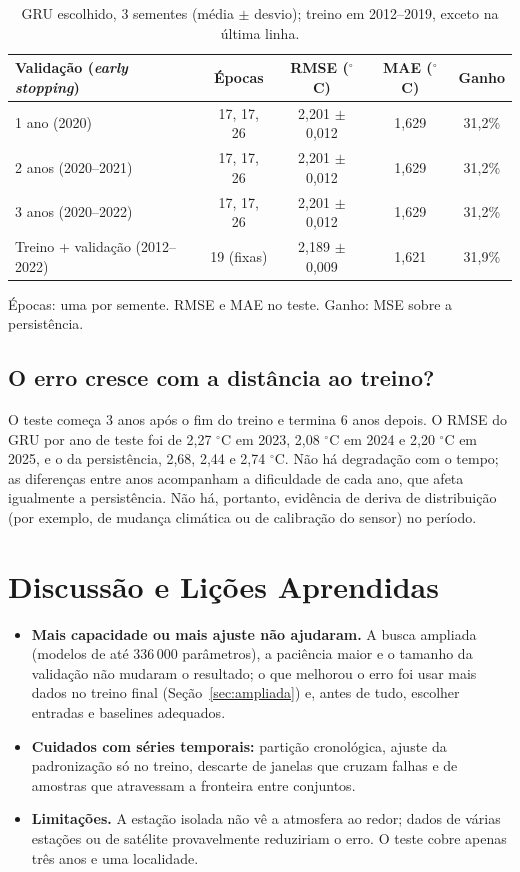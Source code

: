 \documentclass[11pt,a4paper]{article}
\begin{document}
\begin{table}[ht]
\centering
\small
\caption{GRU escolhido, 3 sementes (média $\pm$ desvio); treino em 2012--2019, exceto na última linha.}
\label{tab:valtam}
\begin{tabularx}{\textwidth}{Xcccc}
\toprule
\textbf{Validação (\emph{early stopping})} & \textbf{Épocas} & \textbf{RMSE ($^\circ$C)} & \textbf{MAE ($^\circ$C)} & \textbf{Ganho} \\
\midrule
1 ano (2020) & 17, 17, 26 & 2,201 $\pm$ 0,012 & 1,629 & 31,2\% \\
2 anos (2020--2021) & 17, 17, 26 & 2,201 $\pm$ 0,012 & 1,629 & 31,2\% \\
3 anos (2020--2022) & 17, 17, 26 & 2,201 $\pm$ 0,012 & 1,629 & 31,2\% \\
Treino + validação (2012--2022) & 19 (fixas) & 2,189 $\pm$ 0,009 & 1,621 & 31,9\% \\
\bottomrule
\end{tabularx}
\smallskip

\footnotesize Épocas: uma por semente. RMSE e MAE no teste. Ganho: MSE sobre a persistência.
\end{table}

\subsection{O erro cresce com a distância ao treino?}
O teste começa 3 anos após o fim do treino e termina 6 anos depois. O RMSE do GRU por ano de teste foi de 2,27 $^\circ$C em 2023, 2,08 $^\circ$C em 2024 e 2,20 $^\circ$C em 2025, e o da persistência, 2,68, 2,44 e 2,74 $^\circ$C. Não há degradação com o tempo; as diferenças entre anos acompanham a dificuldade de cada ano, que afeta igualmente a persistência. Não há, portanto, evidência de deriva de distribuição (por exemplo, de mudança climática ou de calibração do sensor) no período.

\section{Discussão e Lições Aprendidas}
\begin{itemize}
    \item \textbf{Mais capacidade ou mais ajuste não ajudaram.} A busca ampliada (modelos de até 336\,000 parâmetros), a paciência maior e o tamanho da validação não mudaram o resultado; o que melhorou o erro foi usar mais dados no treino final (Seção~\ref{sec:ampliada}) e, antes de tudo, escolher entradas e baselines adequados.
    \item \textbf{Cuidados com séries temporais:} partição cronológica, ajuste da padronização só no treino, descarte de janelas que cruzam falhas e de amostras que atravessam a fronteira entre conjuntos.
    \item \textbf{Limitações.} A estação isolada não vê a atmosfera ao redor; dados de várias estações ou de satélite provavelmente reduziriam o erro. O teste cobre apenas três anos e uma localidade. 
\end{itemize}
\end{document}
